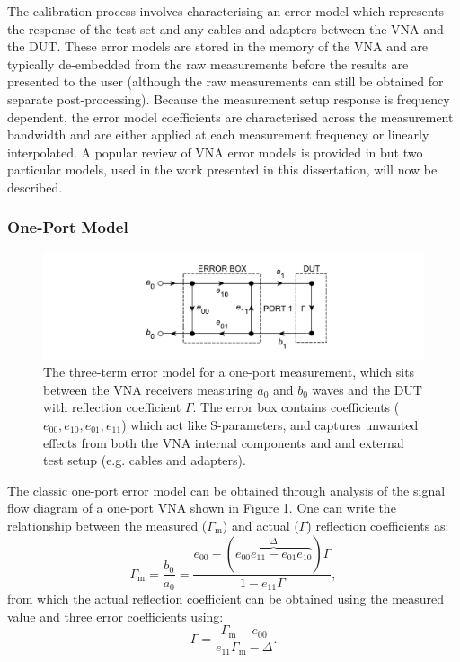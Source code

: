 \documentclass[../thesis/thesis.tex]{subfiles}
\begin{document}
The calibration process involves characterising an error model which represents the response of the test-set and any cables and adapters between the VNA and the DUT. These error models are stored in the memory of the VNA and are typically de-embedded from the raw measurements before the results are presented to the user (although the raw measurements can still be obtained for separate post-processing). Because the measurement setup response is frequency dependent, the error model coefficients are characterised across the measurement bandwidth and are either applied at each measurement frequency or linearly interpolated. A popular review of VNA error models is provided in \cite{Rytting_2000} but two particular models, used in the work presented in this dissertation, will now be described.

\subsubsection{One-Port Model}

\begin{figure}
	\centering
	\includegraphics[width=\textwidth]{ch2_oneport}
	\caption[The three-term VNA error model.]{The three-term error model for a one-port measurement, which sits between the VNA receivers measuring $a_0$ and $b_0$ waves and the DUT with reflection coefficient $\Gamma$. The error box contains coefficients ($e_{00}, e_{10}, e_{01}, e_{11}$) which act like S-parameters, and captures unwanted effects from both the VNA internal components and and external test setup (e.g. cables and adapters).}
	\label{ch2_fig_oneport}
\end{figure}

The classic one-port error model can be obtained through analysis of the signal flow diagram of a one-port VNA shown in Figure \ref{ch2_fig_oneport}. One can write the relationship between the measured ($\Gamma_\textrm{m}$) and actual ($\Gamma$) reflection coefficients as:
\begin{equation}
\Gamma_\textrm{m}=\frac{b_0}{a_0}=\frac{e_{00}-(\overbrace{e_{00}e_{11}-e_{01}e_{10}}^\Delta)\Gamma}{1-e_{11}\Gamma},
\end{equation}
from which the actual reflection coefficient can be obtained using the measured value and three error coefficients using:
\begin{equation}
\Gamma=\frac{\Gamma_\textrm{m}-e_{00}}{e_{11}\Gamma_\textrm{m}-\Delta}.
\label{ch2_eqn_oneport1}
\end{equation}
\end{document}
